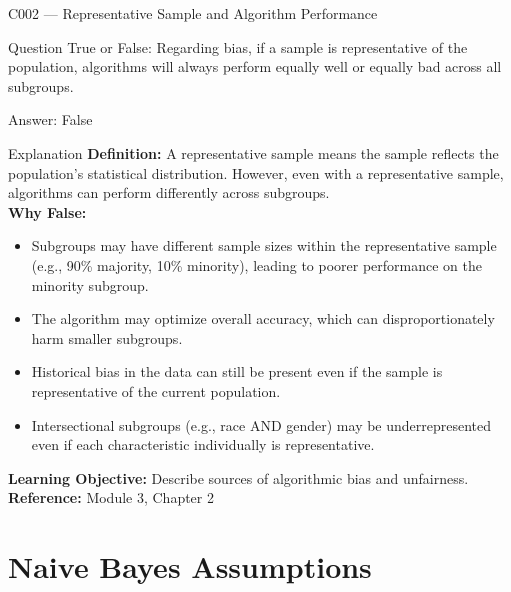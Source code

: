 \documentclass[aspectratio=169,8pt]{beamer}
\begin{document}
	\begin{frame}{C002 --- Representative Sample and Algorithm Performance}
		\begin{block}{Question}
			True or False: Regarding bias, if a sample is representative of the population, algorithms will always perform equally well or equally bad across all subgroups.
		\end{block}
		\begin{exampleblock}{Answer: False}\end{exampleblock}
		\begin{block}{Explanation}
			\textbf{Definition:} A representative sample means the sample reflects the population's statistical distribution. However, even with a representative sample, algorithms can perform differently across subgroups.\\
			\textbf{Why False:} \\
			\begin{itemize}
				\item Subgroups may have different sample sizes within the representative sample (e.g., 90\% majority, 10\% minority), leading to poorer performance on the minority subgroup.
				\item The algorithm may optimize overall accuracy, which can disproportionately harm smaller subgroups.
				\item Historical bias in the data can still be present even if the sample is representative of the current population.
				\item Intersectional subgroups (e.g., race AND gender) may be underrepresented even if each characteristic individually is representative.
			\end{itemize}
			\textbf{Learning Objective:} Describe sources of algorithmic bias and unfairness.\\
			\textbf{Reference:} Module 3, Chapter 2
		\end{block}
	\end{frame}
	
	\section{Naive Bayes Assumptions}
	
\end{document}

